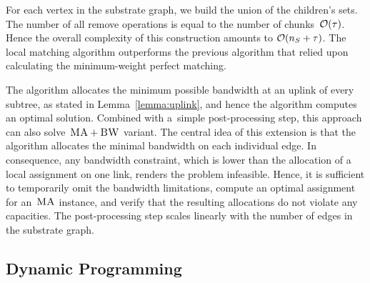  For each
vertex in the substrate graph,
we build the union of the
children's sets.
The number of all remove operations is equal to
the number of chunks~$\mathcal{O}(\tau)$.
Hence the overall complexity of this construction amounts to
$\mathcal{O}(n_S + \tau)$.
The local matching algorithm outperforms the previous algorithm that relied upon calculating the minimum-weight perfect matching.


%

The algorithm allocates the minimum possible bandwidth at an uplink of every subtree, as stated in Lemma~\ref{lemma:uplink}, and hence the algorithm computes an optimal solution.
Combined with a~simple post-processing step, this approach can also solve~$\textsc{MA}+\textsc{BW}$ variant. The central idea of this extension is
that the algorithm allocates the minimal bandwidth
on each individual edge. In consequence, any bandwidth constraint,
which is lower than the allocation of a local assignment on one link, renders
the problem infeasible. Hence, it is sufficient to temporarily omit the
bandwidth limitations, compute an optimal assignment for an~$\textsc{MA}$ instance, and
verify that the resulting allocations do not violate any capacities. The
post-processing step scales linearly with the number of edges in the substrate
graph.


\subsection{Dynamic Programming}\label{ssec:dyn}

